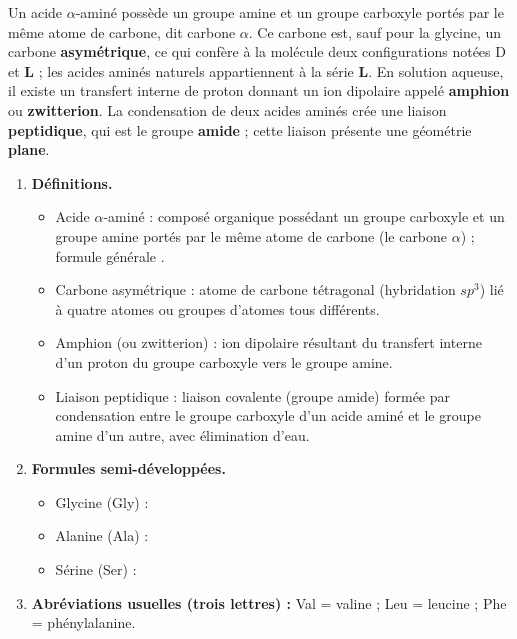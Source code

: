 \documentclass[11pt]{article}
\newcommand{\cle}[1]{{\popxbold\color{popdark}#1}}
\begin{document}
\begin{corrige}
Un acide $\alpha$-aminé possède un groupe amine et un groupe carboxyle portés par le même atome de carbone, dit carbone \textbf{$\alpha$}. Ce carbone est, sauf pour la glycine, un carbone \textbf{asymétrique}, ce qui confère à la molécule deux configurations notées D et \textbf{L} ; les acides aminés naturels appartiennent à la série \textbf{L}. En solution aqueuse, il existe un transfert interne de proton donnant un ion dipolaire appelé \textbf{amphion} ou \textbf{zwitterion}. La condensation de deux acides aminés crée une liaison \textbf{peptidique}, qui est le groupe \textbf{amide} ; cette liaison présente une géométrie \textbf{plane}.
\end{corrige}

\begin{corrige}
\begin{enumerate}
\item \textbf{Définitions.}
\begin{itemize}
\item \cle{Acide $\alpha$-aminé} : composé organique possédant un groupe carboxyle  et un groupe amine  portés par le même atome de carbone (le carbone $\alpha$) ; formule générale .
\item \cle{Carbone asymétrique} : atome de carbone tétragonal (hybridation $sp^3$) lié à quatre atomes ou groupes d'atomes tous différents.
\item \cle{Amphion} (ou zwitterion) : ion dipolaire  résultant du transfert interne d'un proton du groupe carboxyle vers le groupe amine.
\item \cle{Liaison peptidique} : liaison covalente  (groupe amide) formée par condensation entre le groupe carboxyle d'un acide aminé et le groupe amine d'un autre, avec élimination d'eau.
\end{itemize}
\item \textbf{Formules semi-développées.}
\begin{itemize}
\item Glycine (Gly) : 
\item Alanine (Ala) : 
\item Sérine (Ser) : 
\end{itemize}
\item \textbf{Abréviations usuelles (trois lettres) :} Val = valine ; Leu = leucine ; Phe = phénylalanine.
\end{enumerate}
\end{corrige}
\end{document}
